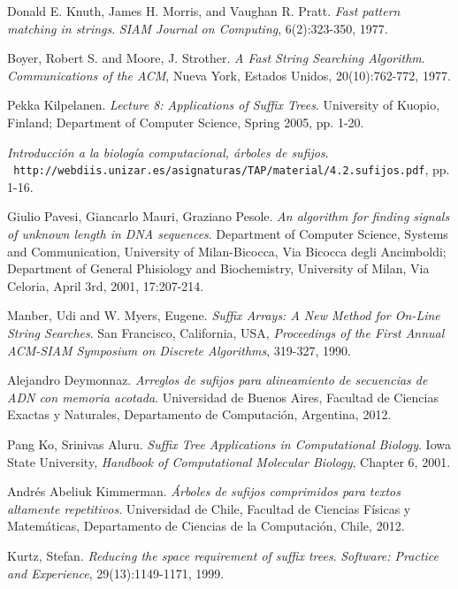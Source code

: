 \documentclass[letterpaper, 10pt, notitlepage]{report}
\begin{document}
\begin{thebibliography}{9}
Donald E. Knuth, James H. Morris, and Vaughan R. Pratt.
\textit{Fast pattern matching in strings}.
\textit{SIAM Journal on Computing}, 6(2):323-350, 1977.

Boyer, Robert S. and Moore, J. Strother.
\textit{A Fast String Searching Algorithm}.
\textit{Communications of the ACM}, Nueva York, Estados Unidos, 20(10):762-772, 1977.

Pekka Kilpelanen.
\textit{Lecture 8: Applications of Suffix Trees}. 
University of Kuopio, Finland; Department of Computer Science, Spring 2005, pp. 1-20.


\textit{Introducción a la biología computacional, árboles de sufijos}.
\\\texttt{ http://webdiis.unizar.es/asignaturas/TAP/material/4.2.sufijos.pdf}, pp. 1-16.

 
Giulio Pavesi, Giancarlo Mauri, Graziano Pesole.
\textit{An algorithm for finding signals of unknown length in DNA sequences}. 
Department of Computer Science, Systems and Communication, University of Milan-Bicocca, Via Bicocca degli Ancimboldi; Department of General Phisiology and Biochemistry, University of Milan, Via Celoria, April 3rd, 2001, 17:207-214.

Manber, Udi and W. Myers, Eugene.
\textit{Suffix Arrays: A New Method for On-Line String Searches}. San Francisco, California, USA, 
\textit{Proceedings of the First Annual ACM-SIAM Symposium on Discrete Algorithms}, 319-327, 1990.

Alejandro Deymonnaz.
\textit{Arreglos de sufijos para alineamiento de secuencias de ADN con memoria acotada}. Universidad de Buenos Aires, Facultad de Ciencias Exactas y Naturales, Departamento de Computación, Argentina, 2012.

Pang Ko, Srinivas Aluru.
\textit{Suffix Tree Applications in Computational Biology}. 
Iowa State University, \textit{Handbook of Computational Molecular Biology}, Chapter 6, 2001.

Andrés Abeliuk Kimmerman.
\textit{Árboles de sufijos comprimidos para textos altamente repetitivos}. Universidad de Chile, Facultad de Ciencias Físicas y Matemáticas, Departamento de Ciencias de la Computación, Chile, 2012.

Kurtz, Stefan.
\textit{Reducing the space requirement of suffix trees}.
\textit{Software: Practice and Experience}, 29(13):1149-1171, 1999.


\end{thebibliography}
\end{document}
